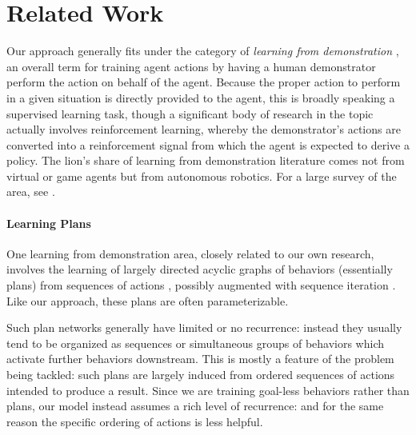 
\section{Related Work}

Our approach generally fits under the category of {\it learning from demonstration} \cite{DBLP:conf/icml/AtkesonS97}, an overall term for training agent actions by having a human demonstrator perform the action on behalf of the agent.  Because the proper action to perform in a given situation is directly provided to the agent, this is broadly speaking a supervised learning task, though a significant body of research in the topic actually involves reinforcement learning, whereby the demonstrator's actions are converted into a reinforcement signal from which the agent is expected to derive a policy.  The lion's share of learning from demonstration literature comes not from virtual or game agents but from autonomous robotics.  For a large survey of the area, see \cite{argall2009}.

\paragraph*{Learning Plans}
One learning from demonstration area, closely related to our own research, involves the learning of largely directed acyclic graphs of behaviors (essentially plans) from sequences of actions \cite{DBLP:conf/atal/AngrosJRS02,DBLP:journals/tsmc/NicolescuM01,DBLP:conf/atal/NicolescuM03,DBLP:conf/hri/RybskiYSV07}, possibly augmented with sequence iteration \cite{DBLP:conf/iros/VeeraraghavanV08}.  Like our approach, these plans are often parameterizable.

Such plan networks generally have limited or no recurrence: instead they usually tend to be organized as sequences or simultaneous groups of behaviors which activate further behaviors downstream.  This is mostly a feature of the problem being tackled: such plans are largely induced from ordered sequences of actions intended to produce a result.  Since we are training goal-less behaviors rather than plans, our model instead assumes a rich level of recurrence: and for the same reason the specific ordering of actions is less helpful.

